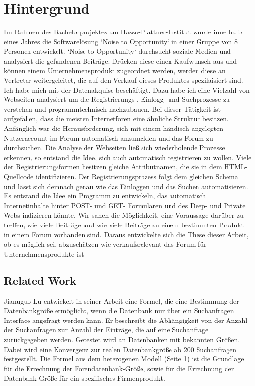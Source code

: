 \section{Hintergrund}

Im Rahmen des Bachelorprojektes am Hasso-Plattner-Institut wurde innerhalb eines Jahres die Softwarelösung `Noise to Opportunity` in einer Gruppe von 8 Personen entwickelt. `Noise to Opportunity` durchsucht soziale Medien und analysiert die gefundenen Beiträge. Drücken diese einen Kaufwunsch aus und können einem Unternehmensprodukt zugeordnet werden, werden diese an Vertreter weitergeleitet, die auf den Verkauf dieses Produktes spezilaisiert sind. Ich habe mich mit der Datenakquise beschäftigt. Dazu habe ich eine Vielzahl von Webseiten analysiert um die Registrierungs-, Einlogg- und Suchprozesse zu verstehen und programmtechnisch nachzubauen. Bei dieser Tätigkeit ist aufgefallen, dass die meisten Internetforen eine ähnliche Struktur besitzen. Anfänglich war die Herausforderung, sich mit einem händisch angelegten Nutzeraccount im Forum automatisch anzumelden und das Forum zu durchsuchen. Die Analyse der Webseiten ließ sich wiederholende Prozesse erkennen, so entstand die Idee, sich auch automatisch registrieren zu wollen.
Viele der Registrierungsformen besitzen gleiche Attributnamen, die sie in dem HTML-Quellcode identifizieren. Der Registrierungsprozess folgt dem gleichen Schema und lässt sich demnach genau wie das Einloggen und das Suchen automatisieren. Es entstand die Idee ein Programm zu entwickeln, das automatisch Internetinhalte hinter POST- und GET- Formularen und des Deep- und Private Webs indizieren könnte. Wir sahen die Möglichkeit, eine Voraussage darüber zu treffen, wie viele Beiträge und wie viele Beiträge zu einem bestimmten Produkt in einem Forum vorhanden sind.
Daraus entwickelte sich die These dieser Arbeit, ob es möglich sei, abzuschätzen wie verkaufsrelevant das Forum für Unternehmensprodukte ist.

\subsection{Related Work}

Jianuguo Lu \cite{lu2008efficient} entwickelt in seiner Arbeit eine Formel, die eine Bestimmung der Datenbankgröße ermöglicht, wenn die Datenbank nur über ein Suchanfragen Interface angefragt werden kann. Er beschreibt die Abhängigkeit von der Anzahl der Suchanfragen zur Anzahl der Einträge, die auf eine Suchanfrage zurückgegeben werden. Getestet wird an Datenbanken mit bekannten Größen. Dabei wird eine Konvergenz zur realen Datenbankgröße ab 200 Suchanfragen festgestellt. Die Formel aus dem heterogenen Modell (Seite 1) ist die Grundlage für die Errechnung der Forendatenbank-Größe, sowie für die Errechnung der Datenbank-Größe für ein spezifisches Firmenprodukt.

